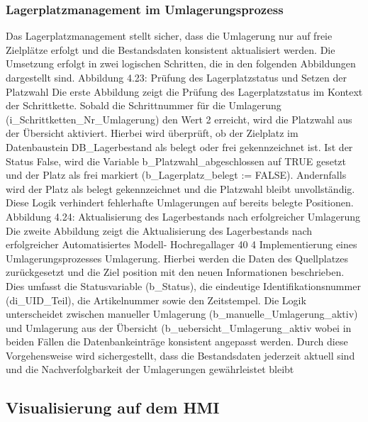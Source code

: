 \subsubsection{Lagerplatzmanagement im Umlagerungsprozess}
Das Lagerplatzmanagement stellt sicher, dass die Umlagerung nur auf freie Zielplätze
erfolgt und die Bestandsdaten konsistent aktualisiert werden. Die Umsetzung erfolgt in
zwei logischen Schritten, die in den folgenden Abbildungen dargestellt sind.
Abbildung 4.23: Prüfung des Lagerplatzstatus und Setzen der Platzwahl
Die erste Abbildung zeigt die Prüfung des Lagerplatzstatus im Kontext der Schrittkette.
Sobald die Schrittnummer für die Umlagerung (i_Schrittketten_Nr_Umlagerung) den
Wert 2 erreicht, wird die Platzwahl aus der Übersicht aktiviert. Hierbei wird überprüft, ob
der Zielplatz im Datenbaustein DB_Lagerbestand als belegt oder frei gekennzeichnet ist.
Ist der Status False, wird die Variable b_Platzwahl_abgeschlossen auf TRUE gesetzt
und der Platz als frei markiert (b_Lagerplatz_belegt := FALSE). Andernfalls wird der
Platz als belegt gekennzeichnet und die Platzwahl bleibt unvollständig. Diese Logik
verhindert fehlerhafte Umlagerungen auf bereits belegte Positionen.
Abbildung 4.24: Aktualisierung des Lagerbestands nach erfolgreicher Umlagerung
Die zweite Abbildung zeigt die Aktualisierung des Lagerbestands nach erfolgreicher
Automatisiertes Modell- Hochregallager
40
4 Implementierung eines Umlagerungsprozesses
Umlagerung. Hierbei werden die Daten des Quellplatzes zurückgesetzt und die Ziel
position mit den neuen Informationen beschrieben. Dies umfasst die Statusvariable
(b_Status), die eindeutige Identifikationsnummer (di_UID_Teil), die Artikelnummer
sowie den Zeitstempel. Die Logik unterscheidet zwischen manueller Umlagerung
(b_manuelle_Umlagerung_aktiv) und Umlagerung aus der Übersicht (b_uebersicht_Umlagerung_aktiv
wobei in beiden Fällen die Datenbankeinträge konsistent angepasst werden. Durch
diese Vorgehensweise wird sichergestellt, dass die Bestandsdaten jederzeit aktuell sind
und die Nachverfolgbarkeit der Umlagerungen gewährleistet bleibt


\subsection{Visualisierung auf dem HMI}


